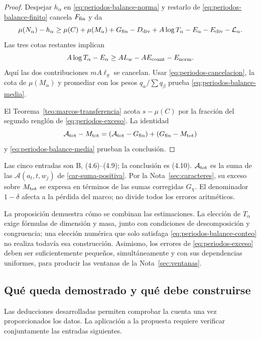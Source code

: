 \begin{proof}
Despejar $h_\alpha$ en \eqref{eq:periodos-balance-norma} y
restarlo de \eqref{eq:periodos-balance-finito} cancela
$F_{\rm fin}$ y da
\[
 \mu(N_\alpha)-h_\alpha
 \ge\mu(C)+\mu(M_\alpha)+G_{\rm fin}-D_{\rm div}
       +A\log T_\alpha-E_\alpha
       -E_{\rm div}-\mathcal L_\alpha.
\]
Las tres cotas restantes implican
\[
 A\log T_\alpha-E_\alpha
 \ge AL_w
             -AE_{\rm count}-E_{\rm norm}.
\]
Aquí las dos contribuciones $mA\ell_g$ se
cancelan. Usar \eqref{eq:periodos-cancelacion}, la cota de
$\mu(M_\alpha)$ y promediar con los pesos $q_\alpha/\sum q_\beta$
prueba \eqref{eq:periodos-balance-media}.

El Teorema~\ref{teo:marcos-transferencia} acota $s-\mu(C)$ por
la fracción del segundo renglón de \eqref{eq:periodos-exceso}.
La identidad
\[
 \mathcal A_{\rm tot}-M_{\rm tot}
   =(\mathcal A_{\rm tot}-G_{\rm fin})+(G_{\rm fin}-M_{\rm tot})
\]
y \eqref{eq:periodos-balance-media} prueban la conclusión.
\end{proof}

Las cinco entradas son B, (4.6)--(4.9); la conclusión es (4.10).
$\mathcal A_{\rm tot}$ es la suma de las
$\mathcal A(a_t,t,w_j)$ de \eqref{car-suma-positiva}. Por la
Nota~\ref{sec:caracteres}, su exceso sobre $M_{\rm tot}$ se expresa
en términos de las sumas corregidas $G_\chi$. El denominador
$1-\delta$ afecta a la pérdida del marco; no divide todos los
errores aritméticos.

La proposición demuestra cómo se combinan las estimaciones. La
elección de $T_\alpha$ exige fórmulas de dimensión y masa, junto con
condiciones de descomposición y congruencia; una elección numérica
que solo satisfaga \eqref{eq:periodos-balance-conteo} no realiza
todavía esa construcción. Asimismo, los errores de
\eqref{eq:periodos-exceso} deben ser suficientemente pequeños,
simultáneamente y con sus dependencias uniformes, para producir
las ventanas de la Nota~\ref{sec:ventanas}.

\subsection{Qué queda demostrado y qué debe construirse}

Las deducciones desarrolladas permiten comprobar la cuenta una vez
proporcionados los datos. La aplicación a la propuesta requiere
verificar conjuntamente las entradas siguientes.

